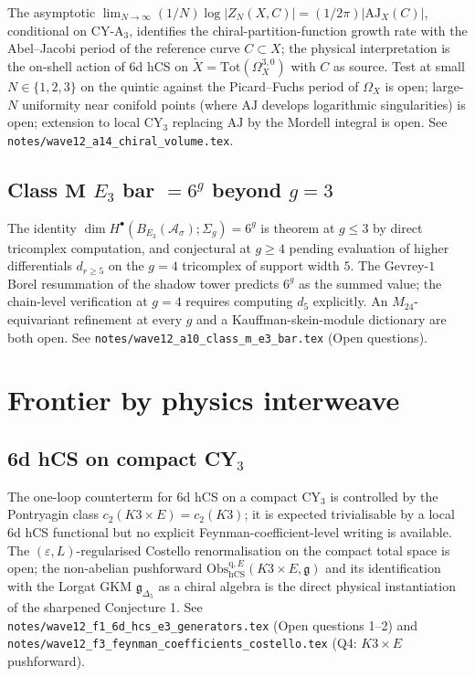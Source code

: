 \documentclass[11pt]{article}
\providecommand{\Ethree}{E_3}
\providecommand{\hCS}{\mathrm{hCS}}
\providecommand{\AJ}{\mathrm{AJ}}
\providecommand{\fg}{\mathfrak{g}}
\providecommand{\Mtf}{M_{24}}
\providecommand{\Obs}{\mathrm{Obs}}
\begin{document}
The asymptotic $\lim_{N \to \infty} (1/N) \log |Z_N(X, C)|
= (1/2\pi) |\AJ_X(C)|$, conditional on CY-A$_3$, identifies the
chiral-partition-function growth rate with the Abel--Jacobi period
of the reference curve $C \subset X$; the physical interpretation is
the on-shell action of 6d hCS on $\widetilde X = \mathrm{Tot}(\Omega^{3, 0}_X)$
with $C$ as source. Test at small $N \in \{1, 2, 3\}$ on the quintic
against the Picard--Fuchs period of $\Omega_X$ is open; large-$N$
uniformity near conifold points (where $\AJ$ develops logarithmic
singularities) is open; extension to local CY$_3$ replacing $\AJ$ by
the Mordell integral is open. See
\texttt{notes/wave12\_a14\_chiral\_volume.tex}.

\subsection{Class $\mathbf{M}$ $\Ethree$ bar $= 6^g$ beyond $g = 3$}

The identity $\dim H^\bullet(B_{\Ethree}(\mathcal{A}_\sigma); \Sigma_g)
= 6^g$ is theorem at $g \leq 3$ by direct tricomplex computation, and
conjectural at $g \geq 4$ pending evaluation of higher differentials
$d_{r \geq 5}$ on the $g = 4$ tricomplex of support width $5$. The
Gevrey-$1$ Borel resummation of the shadow tower predicts $6^g$ as
the summed value; the chain-level verification at $g = 4$ requires
computing $d_5$ explicitly. An $\Mtf$-equivariant refinement at
every $g$ and a Kauffman-skein-module dictionary are both open. See
\texttt{notes/wave12\_a10\_class\_m\_e3\_bar.tex} (Open questions).

\section{Frontier by physics interweave}

\subsection{6d hCS on compact CY$_3$}

The one-loop counterterm for 6d hCS on a compact CY$_3$ is controlled
by the Pontryagin class $c_2(K3 \times E) = c_2(K3)$; it is expected
trivialisable by a local 6d hCS functional but no explicit
Feynman-coefficient-level writing is available. The
$(\varepsilon, L)$-regularised Costello renormalisation on the
compact total space is open; the non-abelian pushforward
$\Obs^{\mathrm{q}, E}_{\hCS}(K3 \times E, \fg)$ and its
identification with the Lorgat GKM $\fg_{\Delta_5}$ as a chiral
algebra is the direct physical instantiation of the sharpened
Conjecture 1. See
\texttt{notes/wave12\_f1\_6d\_hcs\_e3\_generators.tex} (Open
questions 1--2) and
\texttt{notes/wave12\_f3\_feynman\_coefficients\_costello.tex}
(Q4: $K3 \times E$ pushforward).
\end{document}
